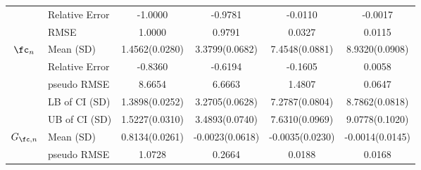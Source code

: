 \begin{table}[]
{\begin{minipage}[t]{0.48\textwidth}
{\begin{tabular}{clcccc}
 & Relative Error & -1.0000 & -0.9781 & -0.0110 & -0.0017 \\
 & RMSE & 1.0000 & 0.9791 & 0.0327 & 0.0115 \\\hline
\multirow{5}{*}{$\fc_n$} & Mean (SD) & 1.4562(0.0280) & 3.3799(0.0682) & 7.4548(0.0881) & 8.9320(0.0908) \\
 & Relative Error & -0.8360 & -0.6194 & -0.1605 & 0.0058 \\
 & pseudo RMSE & 8.6654	& 6.6663	& 1.4807	& 0.0647 \\
 & LB of CI (SD) & 1.3898(0.0252) & 3.2705(0.0628) & 7.2787(0.0804) & 8.7862(0.0818) \\
 & UB of CI (SD) & 1.5227(0.0310) & 3.4893(0.0740) & 7.6310(0.0969) & 9.0778(0.1020) \\\hline
\multirow{2}{*}{$G_{\fc,n}$} & Mean (SD) & 0.8134(0.0261) & -0.0023(0.0618) & -0.0035(0.0230) & -0.0014(0.0145) \\
 & pseudo RMSE & 1.0728	& 0.2664	& 0.0188	& 0.0168\\\bottomrule
\end{tabular}}
\end{minipage}}{}
\end{table}